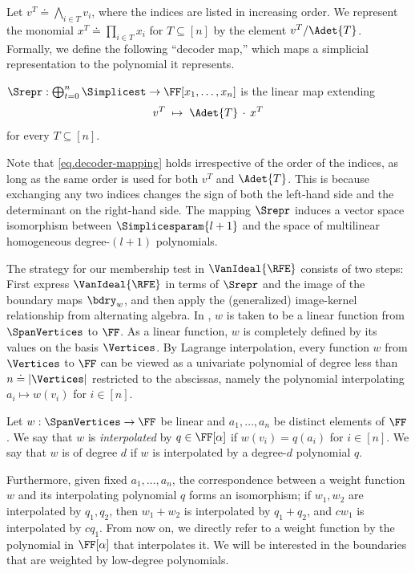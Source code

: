\documentclass{toc}
\begin{document}
Let $v^T\doteq \bigwedge_{i\in T} v_i$, where the indices are listed in increasing order. We represent the monomial $x^T \doteq \prod_{i \in T} x_i$ for $T \subseteq [n]$ by the element $v^T/\Adet{T}$. Formally, we define the following ``decoder map,'' which maps a simplicial representation to the polynomial it represents.
\begin{definition}[representation]
  \label{def.Srepr-prim}
  \(\Srepr : \bigoplus_{t=0}^{n}\Simplicest \to \FF[x_1,\ldots,x_n]\) is the linear
  map extending
  \begin{equation}\label{eq.decoder-mapping}
    v^T
    \;\mapsto\;
    \Adet{T}\,\cdot\,x^T
  \end{equation}
  for every $T \subseteq [n]$.
\end{definition}
Note that \eqref{eq.decoder-mapping} holds irrespective of the order of the indices, as long as the same order is used for both $v^T$ and $\Adet{T}$. This is because exchanging any two indices changes the sign of both the left-hand side and the determinant on the right-hand side. The mapping \(\Srepr\) induces a vector space isomorphism between
\(\Simplicesparam{l+1}\) and the space of multilinear homogeneous degree-\((l+1)\) polynomials.

\medskip

The strategy for our membership test in \(\VanIdeal{\RFE}\) consists of two steps: First express \(\VanIdeal{\RFE}\) in terms of $\Srepr$ and the image of the boundary maps $\bdry_w$, and then apply the (generalized) image-kernel relationship from alternating algebra. In , $w$ is taken to be a linear function from $\SpanVertices$ to $\FF$. As a linear function, $w$ is completely defined by its values on the basis $\Vertices$. By Lagrange interpolation, every function $w$ from $\Vertices$ to $\FF$ can be viewed as a univariate polynomial of degree less than $n \doteq |\Vertices|$ restricted to the abscissas, namely the polynomial interpolating $a_i \mapsto w(v_i)$ for $i \in [n]$. 
\begin{definition}
  \label{def.deg.polybdry}
  Let $w: \SpanVertices \to \FF$ be linear and $a_1, \dots, a_n$ be distinct elements of $\FF$. We say that $w$ is \emph{interpolated} by $q\in \FF[\alpha]$ if $w(v_i) = q(a_i)$ for $i\in [n]$. We say that $w$  is of degree $d$ if $w$ is interpolated by a degree-$d$ polynomial $q$.
\end{definition}

Furthermore, given fixed $a_1,\dots,a_n$, the correspondence between a weight function $w$ and its interpolating polynomial $q$ forms an isomorphism; if $w_1,w_2$ are interpolated by $q_1,q_2$, then $w_1+w_2$ is interpolated by $q_1+q_2$, and $cw_1$ is interpolated by $cq_1$. From now on, we directly refer to a weight function by the polynomial in $\FF[\alpha]$ that interpolates it. We will be interested in the boundaries that are weighted by low-degree polynomials.
\end{document}
